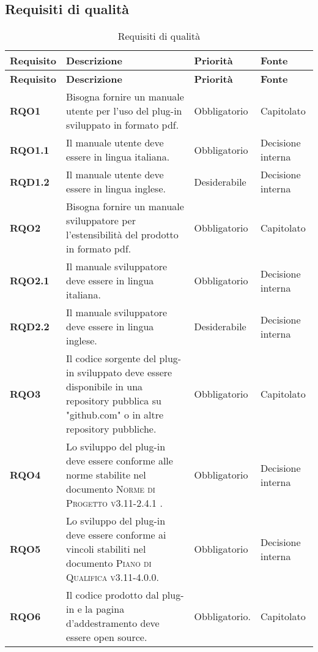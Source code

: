 \subsection{Requisiti di qualità}
\label{sub:requisiti_di_qualita}

\renewcommand{\arraystretch}{2} %
\begin{longtable}[H]{>{\centering\bfseries}m{2cm} >{\centering}m{9cm} >{\centering}m{2.5cm} >{\centering\arraybackslash}m{2.5cm}}
  \caption{Requisiti di qualità}%
  \label{tab:requisiti_di_qualità}                                                    \\
  \rowcolor{lightgray}
  {\textbf{Requisito}} & {\textbf{Descrizione}} & {\textbf{Priorità}} & {\textbf{Fonte}}  \\
  \endfirsthead%
  \rowcolor{lightgray}
  {\textbf{Requisito}} & {\textbf{Descrizione}} & {\textbf{Priorità}} & {\textbf{Fonte}}  \\
  \endhead%
  \rowcolor{white}
  \multicolumn{4}{c}{\textit{Continua alla pagina successiva}}
  \endfoot%
  \endlastfoot%
  \textbf{RQO1} & Bisogna fornire un manuale utente per l'uso del plug-in sviluppato in formato pdf. & Obbligatorio & Capitolato \\
  \textbf{RQO1.1} & Il manuale utente deve essere in lingua italiana. & Obbligatorio & Decisione interna \\
  \textbf{RQD1.2} & Il manuale utente deve essere in lingua inglese. & Desiderabile & Decisione interna \\
  \textbf{RQO2} & Bisogna fornire un manuale sviluppatore per l'estensibilità del prodotto in formato pdf. & Obbligatorio & Capitolato \\
  \textbf{RQO2.1} & Il manuale sviluppatore deve essere in lingua italiana. & Obbligatorio & Decisione interna \\
  \textbf{RQD2.2} & Il manuale sviluppatore deve essere in lingua inglese. & Desiderabile & Decisione interna \\
  \textbf{RQO3} & Il codice sorgente del plug-in sviluppato deve essere disponibile in una repository pubblica su "github.com" o in altre repository pubbliche. & Obbligatorio & Capitolato \\
  \textbf{RQO4} & Lo sviluppo del plug-in deve essere conforme alle norme stabilite nel documento \textsc{Norme di Progetto v3.11-2.4.1} . & Obbligatorio & Decisione interna \\
  \textbf{RQO5} & Lo sviluppo del plug-in deve essere conforme ai vincoli stabiliti nel documento \textsc{Piano di Qualifica v3.11-4.0.0}. & Obbligatorio & Decisione interna \\
  \textbf{RQO6} & Il codice prodotto dal plug-in e la pagina d'addestramento deve essere open source. & Obbligatorio. & Capitolato \\
\end{longtable}
